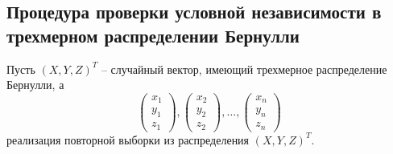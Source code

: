\subsection{Процедура проверки условной независимости
в трехмерном распределении Бернулли}

Пусть $(X,Y,Z)^T$ -- случайный вектор, имеющий трехмерное распределение
Бернулли, а
$$
\begin{pmatrix}
        x_1 \\
        y_1 \\
        z_1
    \end{pmatrix},
    \begin{pmatrix}
        x_2 \\
        y_2 \\
        z_2
    \end{pmatrix}, \ldots,
    \begin{pmatrix}
        x_n \\
        y_n \\
        z_n
    \end{pmatrix}
$$ реализация повторной выборки из распределения $(X,Y,Z)^T$.

